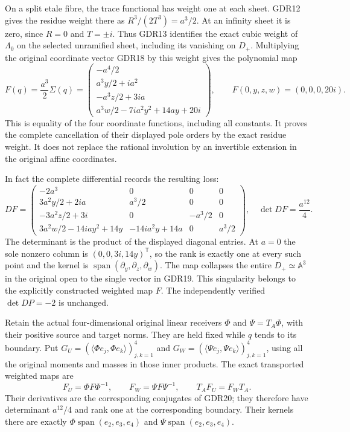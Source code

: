 \documentclass[11pt]{article}
\begin{document}
On a split etale fibre, the trace functional has weight one
at each sheet. GDR12 gives the residue weight there as
$R^3/(2T^3)=a^3/2$. At an infinity sheet it is zero, since
$R=0$ and $T=\pm i$. Thus GDR13 identifies the exact cubic
weight of $\Lambda_0$ on the selected unramified sheet,
including its vanishing on $D_+$.
Multiplying the original coordinate vector GDR18 by this
weight gives the polynomial map
\begin{equation}
 F(q)=\frac{a^3}{2}\Sigma(q)=
 \begin{pmatrix}
 -a^4/2\\a^3y/2+ia^2\\-a^3z/2+3ia\\
 a^3w/2-7ia^2y^2+14ay+20i
 \end{pmatrix},\qquad
 F(0,y,z,w)=(0,0,0,20i).
 \tag{GDR19}
\end{equation}
This is equality of the four coordinate functions, including
all constants. It proves the complete cancellation of their
displayed pole orders by the exact residue weight. It does not
replace the rational involution by an invertible extension in
the original affine coordinates.

In fact the complete differential records the resulting loss:
\begin{equation}
 DF=\begin{pmatrix}
 -2a^3&0&0&0\\
 3a^2y/2+2ia&a^3/2&0&0\\
 -3a^2z/2+3i&0&-a^3/2&0\\
 3a^2w/2-14iay^2+14y&-14ia^2y+14a&0&a^3/2
 \end{pmatrix},
 \quad\det DF=\frac{a^{12}}4.
 \tag{GDR20}
\end{equation}
The determinant is the product of the displayed diagonal
entries. At $a=0$ the sole nonzero column is
$(0,0,3i,14y)^{\mathsf T}$, so the rank is exactly one
at every such point and the kernel is
$\operatorname{span}(\partial_y,\partial_z,\partial_w)$.
The map collapses the entire $D_+\simeq\mathbb A^3$ in the
original open to the single vector in GDR19. This singularity
belongs to the explicitly constructed weighted map $F$.
The independently verified $\det DP=-2$ is unchanged.

Retain the actual four-dimensional original linear receivers
$\Phi$ and $\Psi=T_A\Phi$, with their positive source and
target norms. They are held fixed while $q$ tends to its
boundary. Put
$G_U=(\langle\Phi e_j,\Phi e_k\rangle)_{j,k=1}^4$ and
$G_W=(\langle\Psi e_j,\Psi e_k\rangle)_{j,k=1}^4$,
using all the original moments and masses in those inner
products. The exact transported weighted maps are
\begin{equation}
 F_U=\Phi F\Phi^{-1},\qquad F_W=\Psi F\Psi^{-1},\qquad
 T_AF_U=F_WT_A.
 \tag{GDR21}
\end{equation}
Their derivatives are the corresponding conjugates of GDR20;
they therefore have determinant $a^{12}/4$ and rank one at
the corresponding boundary. Their kernels there are exactly
$\Phi\operatorname{span}(e_2,e_3,e_4)$ and
$\Psi\operatorname{span}(e_2,e_3,e_4)$.
\end{document}
